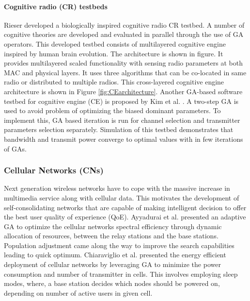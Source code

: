 \documentclass[journal]{IEEEtran}
\begin{document}
\vspace{2mm}
\paragraph{Cognitive radio (CR) testbeds}

Rieser \cite{rieser2004biologically} developed a biologically inspired cognitive radio CR testbed. A number of cognitive theories are developed and evaluated in parallel through the use of GA operators. This developed testbed consists of multilayered cognitive engine inspired by human brain evolution. The architecture is shown in figure. It provides multilayered scaled functionality with sensing radio parameters at both MAC and physical layers. It uses three algorithms that can be co-located in same radio or distributed to multiple radios. This cross-layered cognitive engine architecture is shown in Figure \ref{fig:CEarchitecture}. Another GA-based software testbed for cognitive engine (CE) is proposed by Kim et al. \cite{kim2008cognitive}. A two-step GA is used to avoid problem of optimizing the biased dominant parameters. To implement this, GA based iteration is run for channel selection and transmitter parameters selection separately. Simulation of this testbed demonstrates that bandwidth and transmit power converge to optimal values with in few iterations of GAs.
 


\vspace{2mm} 
\subsubsection{Cellular Networks (CNs)}

Next generation wireless networks have to cope with the massive increase in multimedia service along with cellular data. This motivates the development of self-consolidating networks that are capable of making intelligent decision to offer the best user quality of experience (QoE). Ayyadurai et al. \cite{ayyadurai2011multihop} presented an adaptive GA to optimize the cellular networks spectral efficiency through dynamic allocation of resources, between the relay stations and the base stations. Population adjustment came along the way to improve the search capabilities leading to quick optimum. Chiaraviglio et al. \cite{chiaraviglio2012energy} presented the energy efficient deployment of cellular networks by leveraging GA to minimize the power consumption and number of transmitter in cells. This involves employing sleep modes, where, a base station decides which nodes should be powered on, depending on number of active users in given cell.
\end{document}
